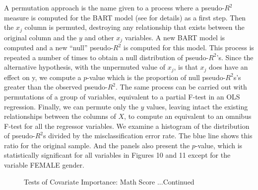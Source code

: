 \documentclass[alpha-refs,fleqn]{wiley-article_p2}
\begin{document}
A permutation approach is the name given to a process where a pseudo-$R^2$ measure is computed for the BART model (see \cite{Kapelner_2016} for details) as a first step. Then the {$x_j$} column is permuted, destroying any relationship that exists between the original column and the {$y$} and other $x_j$ variables. A new BART model is computed and a new ``null'' pseudo-$R^2$ is computed for this model. This process is repeated a number of times to obtain a null distribution of pseudo-$R^2$'s. Since the alternative hypothesis, with the unpermuted value of $x_j$, is that $x_j$ does have an effect on y, we compute a $p$-value which is the proportion of null pseudo-$R^2$s's greater than the observed pseudo-$R^2$. The same process can be carried out with permutations of a group of variables, equivalent to a partial F-test in an OLS regression.  Finally, we can permute only the $y$ values, leaving intact the existing relationships between the columns of $X$, to compute an equivalent to an omnibus F-test for all the regressor variables. We examine a histogram of the distribution of pseudo-$R^2$s divided by the misclassification error rate. The blue line shows this ratio for the original sample. And the panels also present the $p$-value, which is statistically significant for all variables in Figures 10 and 11 except for the variable FEMALE gender.  

\setcounter{subfigure}{12}
\begin{group} 
\begin{figure}[htbp!]
\begin{subfigure}[Panel M. Teacher Double Major]{
\texttt{[image: Fig3w16.png]}}
\end{subfigure}
\begin{subfigure}[Panel N. ICTSCH ]{
\texttt{[image: Fig3w17.png]}}
\end{subfigure}
\begin{subfigure}[Panel O. Counterfactual ]{
\texttt{[image: Fig3w19.png]}}
\end{subfigure}
\begin{subfigure}[Panel P. Treatment ]{
\texttt{[image: Fig3w21.png]}}
\end{subfigure}
\centering
\begin{subfigure}[Panel Q. Top 6 important variables ]{
\texttt{[image: Fig3w22.png]}}
\end{subfigure}
\begin{subfigure}[Panel R. Omnibus Test Analog of F-Test]{
\texttt{[image: Fig3w23.png]}}
\end{subfigure}
\caption{Tests of Covariate Importance: Math Score ...Continued}\label{fig:1}
\end{figure}
\end{group} 
\end{document}
